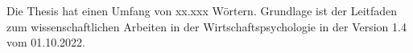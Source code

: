 \begin{singlespace}%
\listoffigures
\clearpage
\listoftables
\clearpage
\tableofcontents


Die Thesis hat einen Umfang von xx.xxx Wörtern.
Grundlage ist der Leitfaden zum wissenschaftlichen Arbeiten in der Wirtschaftspsychologie in der Version 1.4 vom 01.10.2022.
\end{singlespace}
